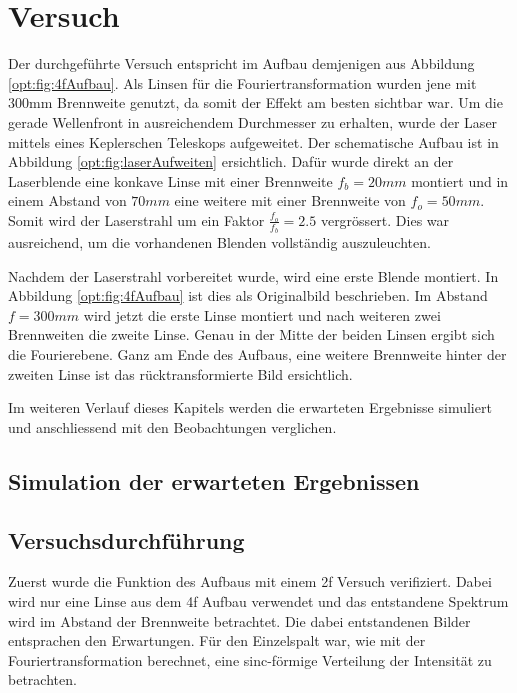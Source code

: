 %
%
%
%
\section{Versuch
\label{opt:section:versuch}}

Der durchgeführte Versuch entspricht im Aufbau demjenigen aus Abbildung \ref{opt:fig:4fAufbau}.
Als Linsen für die Fouriertransformation wurden jene mit 300mm Brennweite genutzt, da somit der Effekt am besten sichtbar war.
Um die gerade Wellenfront in ausreichendem Durchmesser zu erhalten, wurde der Laser mittels eines Keplerschen Teleskops aufgeweitet.
Der schematische Aufbau ist in Abbildung \ref{opt:fig:laserAufweiten} ersichtlich.
Dafür wurde direkt an der Laserblende eine konkave Linse mit einer Brennweite $f_b = 20mm$ montiert und in einem Abstand von $70mm$ eine weitere mit einer Brennweite von $f_o = 50mm$.
Somit wird der Laserstrahl um ein Faktor $\frac{f_o}{f_b} = 2.5$ vergrössert.
Dies war ausreichend, um die vorhandenen Blenden vollständig auszuleuchten.

Nachdem der Laserstrahl vorbereitet wurde, wird eine erste Blende montiert.
In Abbildung \ref{opt:fig:4fAufbau} ist dies als Originalbild beschrieben.
Im Abstand $f=300mm$ wird jetzt die erste Linse montiert und nach weiteren zwei Brennweiten die zweite Linse.
Genau in der Mitte der beiden Linsen ergibt sich die Fourierebene.
Ganz am Ende des Aufbaus, eine weitere Brennweite hinter der zweiten Linse ist das rücktransformierte Bild ersichtlich.

Im weiteren Verlauf dieses Kapitels werden die erwarteten Ergebnisse simuliert und anschliessend mit den Beobachtungen verglichen.

\subsection{Simulation der erwarteten Ergebnissen}

\subsection{Versuchsdurchführung}
Zuerst wurde die Funktion des Aufbaus mit einem 2f Versuch verifiziert.
Dabei wird nur eine Linse aus dem 4f Aufbau verwendet und das entstandene Spektrum wird im Abstand der Brennweite betrachtet.
Die dabei entstandenen Bilder entsprachen den Erwartungen.
Für den Einzelspalt war, wie mit der Fouriertransformation berechnet, eine sinc-förmige Verteilung der Intensität zu betrachten.

